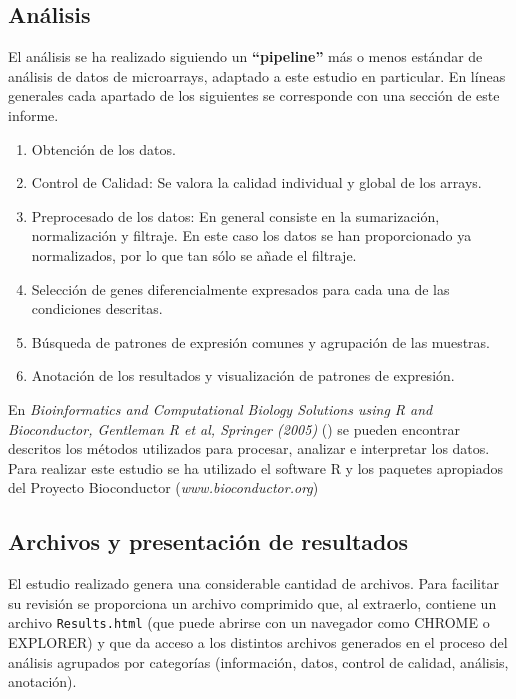 \documentclass[a4paper]{article}\usepackage[]{graphicx}\usepackage[]{color}
\begin{document}
\subsection{An\'alisis}

El an\'alisis se ha realizado siguiendo un \textbf{``pipeline''} más o
menos estándar de an\'alisis de datos de microarrays, adaptado a este
estudio en particular.  En l\'ineas generales cada apartado de los
siguientes se corresponde con una secci\'on de este informe.
\begin{enumerate}
\item Obtención de los datos.
\item Control de Calidad: Se valora la calidad individual y global de
  los arrays. 
\item Preprocesado de los datos: En general consiste en la
  sumarizaci\'on, normalizaci\'on y filtraje. En este caso los datos
  se han proporcionado ya normalizados, por lo que tan sólo se añade
  el filtraje.
\item Selecci\'on de genes diferencialmente expresados para cada una de las condiciones descritas.
\item B\'usqueda de patrones de expresi\'on comunes y agrupaci\'on de las muestras.
\item Anotaci\'on de los resultados y visualización de patrones de expresión.
\end{enumerate}


En \textit{Bioinformatics and Computational Biology Solutions using
  {R} and Bioconductor, Gentleman R et al, Springer (2005)} (\cite{Gentleman:2005}) se pueden
encontrar descritos los m\'etodos utilizados para procesar, analizar e
interpretar los datos. Para realizar este estudio se ha utilizado el
software {R} y los paquetes apropiados del Proyecto Bioconductor
(\textit{www.bioconductor.org})

\subsection{Archivos y presentación de resultados}

El estudio realizado genera una considerable cantidad de
archivos. Para facilitar su revisión se proporciona un archivo
comprimido que, al extraerlo, contiene un archivo
\texttt{Results.html} (que puede abrirse con un navegador como CHROME
o EXPLORER) y que da acceso a los distintos archivos generados en el
proceso del an\'alisis agrupados por categorías (información, datos,
control de calidad, análisis, anotación).
\end{document}
